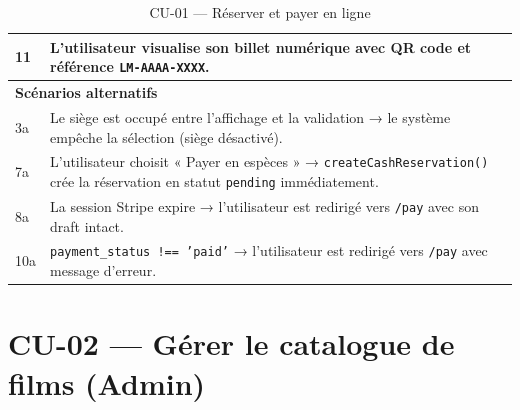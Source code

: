 \documentclass[12pt,a4paper,openany]{report}
\begin{document}
\begin{table}[H]
\begin{tabularx}{\textwidth}{lX}
11 & L'utilisateur visualise son billet numérique avec QR code et référence \texttt{LM-AAAA-XXXX}. \\
\midrule
\multicolumn{2}{l}{\textbf{Scénarios alternatifs}} \\
\midrule
3a & Le siège est occupé entre l'affichage et la validation → le système empêche la sélection (siège désactivé). \\
7a & L'utilisateur choisit « Payer en espèces » → \texttt{createCashReservation()} crée la réservation en statut \texttt{pending} immédiatement. \\
8a & La session Stripe expire → l'utilisateur est redirigé vers \texttt{/pay} avec son draft intact. \\
10a & \texttt{payment\_status !== 'paid'} → l'utilisateur est redirigé vers \texttt{/pay} avec message d'erreur. \\
\bottomrule
\end{tabularx}
\caption{CU-01 — Réserver et payer en ligne}
\end{table}

\newpage
\section{CU-02 — Gérer le catalogue de films (Admin)}
\end{document}
